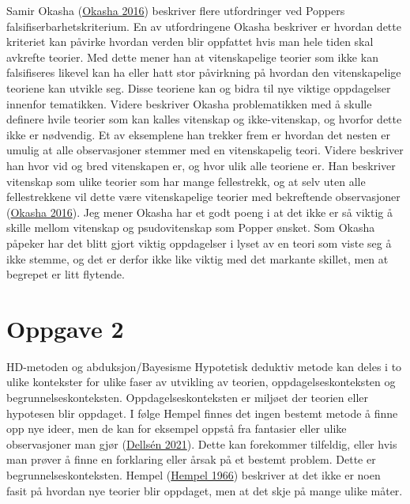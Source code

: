\documentclass[
]{book}
\begin{document}
Samir Okasha (\protect\hyperlink{ref-okasha2016}{Okasha 2016}) beskriver
flere utfordringer ved Poppers falsifiserbarhetskriterium. En av
utfordringene Okasha beskriver er hvordan dette kriteriet kan påvirke
hvordan verden blir oppfattet hvis man hele tiden skal avkrefte teorier.
Med dette mener han at vitenskapelige teorier som ikke kan falsifiseres
likevel kan ha eller hatt stor påvirkning på hvordan den vitenskapelige
teoriene kan utvikle seg. Disse teoriene kan og bidra til nye viktige
oppdagelser innenfor tematikken. Videre beskriver Okasha problematikken
med å skulle definere hvile teorier som kan kalles vitenskap og
ikke-vitenskap, og hvorfor dette ikke er nødvendig. Et av eksemplene han
trekker frem er hvordan det nesten er umulig at alle observasjoner
stemmer med en vitenskapelig teori. Videre beskriver han hvor vid og
bred vitenskapen er, og hvor ulik alle teoriene er. Han beskriver
vitenskap som ulike teorier som har mange fellestrekk, og at selv uten
alle fellestrekkene vil dette være vitenskapelige teorier med
bekreftende observasjoner (\protect\hyperlink{ref-okasha2016}{Okasha
2016}). Jeg mener Okasha har et godt poeng i at det ikke er så viktig å
skille mellom vitenskap og psudovitenskap som Popper ønsket. Som Okasha
påpeker har det blitt gjort viktig oppdagelser i lyset av en teori som
viste seg å ikke stemme, og det er derfor ikke like viktig med det
markante skillet, men at begrepet er litt flytende.

\hypertarget{oppgave-2}{%
\section{Oppgave 2}\label{oppgave-2}}

HD-metoden og abduksjon/Bayesisme Hypotetisk deduktiv metode kan deles i
to ulike kontekster for ulike faser av utvikling av teorien,
oppdagelseskonteksten og begrunnelseskonteksten. Oppdagelseskonteksten
er miljøet der teorien eller hypotesen blir oppdaget. I følge Hempel
finnes det ingen bestemt metode å finne opp nye ideer, men de kan for
eksempel oppstå fra fantasier eller ulike observasjoner man gjør
(\protect\hyperlink{ref-dellsuxe9n2021}{Dellsén 2021}). Dette kan
forekommer tilfeldig, eller hvis man prøver å finne en forklaring eller
årsak på et bestemt problem. Dette er begrunnelseskonteksten. Hempel
(\protect\hyperlink{ref-hempel1966}{Hempel 1966}) beskriver at det ikke
er noen fasit på hvordan nye teorier blir oppdaget, men at det skje på
mange ulike måter.
\end{document}
